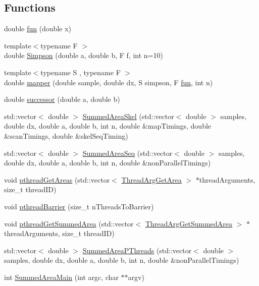 \subsection*{Functions}
\begin{DoxyCompactItemize}
\item 
double \hyperlink{namespaceSummedArea_a23da63c99eaf3779a955eaf64c24692c}{fun} (double x)
\item 
{\footnotesize template$<$typename F $>$ }\\double \hyperlink{namespaceSummedArea_a4528023a390e109ccd2f2913d7c2e2cb}{Simpson} (double a, double b, F f, int n=10)
\item 
{\footnotesize template$<$typename S , typename F $>$ }\\double \hyperlink{namespaceSummedArea_abb2663d88d1546ab79957d4a163c7171}{mapper} (double sample, double dx, S simpson, F \hyperlink{namespaceSummedArea_a23da63c99eaf3779a955eaf64c24692c}{fun}, int n)
\item 
double \hyperlink{namespaceSummedArea_a5bfa1de246fced49a7feac63c29152e2}{successor} (double a, double b)
\item 
std\-::vector$<$ double $>$ \hyperlink{namespaceSummedArea_a622887e5889536580ca8d3cea80eb7d2}{Summed\-Area\-Skel} (std\-::vector$<$ double $>$ samples, double dx, double a, double b, int n, double \&map\-Timings, double \&scan\-Timings, double \&skel\-Seq\-Timing)
\item 
std\-::vector$<$ double $>$ \hyperlink{namespaceSummedArea_ad3c493f61e906a1dce9649882744daac}{Summed\-Area\-Seq} (std\-::vector$<$ double $>$ samples, double dx, double a, double b, int n, double \&non\-Parallel\-Timings)
\item 
void \hyperlink{namespaceSummedArea_ab9a94bb4d4b9000c58022d816d19c06e}{pthread\-Get\-Areas} (std\-::vector$<$ \hyperlink{classSummedArea_1_1ThreadArgGetArea}{Thread\-Arg\-Get\-Area} $>$ $\ast$thread\-Arguments, size\-\_\-t thread\-I\-D)
\item 
void \hyperlink{namespaceSummedArea_a7ee6f74994b86b577108cf74a435686b}{pthread\-Barrier} (size\-\_\-t n\-Threads\-To\-Barrier)
\item 
void \hyperlink{namespaceSummedArea_abf56efddeb21ba74a89c6516ca5aaa42}{pthread\-Get\-Summed\-Area} (std\-::vector$<$ \hyperlink{classSummedArea_1_1ThreadArgGetSummedArea}{Thread\-Arg\-Get\-Summed\-Area} $>$ $\ast$thread\-Arguments, size\-\_\-t thread\-I\-D)
\item 
std\-::vector$<$ double $>$ \hyperlink{namespaceSummedArea_ab02a87090c4d81e708b043986e2bac80}{Summed\-Area\-P\-Threads} (std\-::vector$<$ double $>$ samples, double dx, double a, double b, int n, double \&non\-Parallel\-Timings)
\item 
int \hyperlink{namespaceSummedArea_a86ddb68dbedbd8826059c8d569a1e1e5}{Summed\-Area\-Main} (int argc, char $\ast$$\ast$argv)
\end{DoxyCompactItemize}
